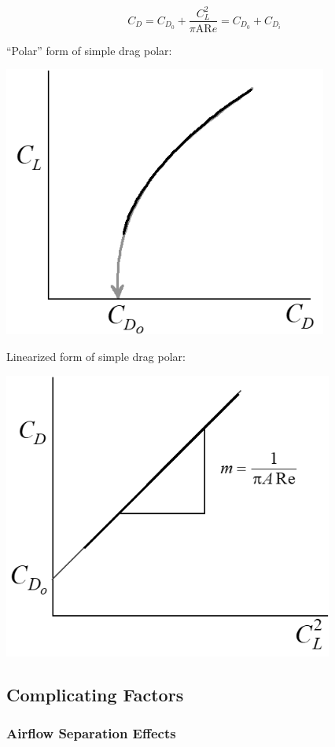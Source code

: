 \documentclass[
]{book}
\begin{document}
\[C_D = C_{D_0} + \frac{C_L^2}{\pi \mathrm{AR} e} = C_{D_0} + C_{D_i}\]

``Polar'' form of simple drag polar:

\includegraphics[width=4.203in,height=3.513in]{media/05/image73.png}

Linearized form of simple drag polar:

\includegraphics[width=4.272in,height=3.725in]{media/05/image75.png}

\hypertarget{complicating-factors}{%
\subsection{Complicating Factors}\label{complicating-factors}}

\hypertarget{airflow-separation-effects}{%
\subsubsection*{Airflow Separation Effects}\label{airflow-separation-effects}}
\end{document}
